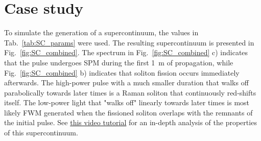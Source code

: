 \begin{table}[]
\end{table}
\section{Case study}
To simulate the generation of a supercontinuum, the values in Tab.~\ref{tab:SC_params} were used. The resulting supercontinuum is presented in Fig.~\ref{fig:SC_combined}. The spectrum in Fig.~\ref{fig:SC_combined} c) indicates that the pulse undergoes SPM during the first 1~m of propagation, while Fig.~\ref{fig:SC_combined} b) indicates that soliton fission occurs immediately afterwards. The high-power pulse with a much smaller duration that walks off parabolically towards later times is a Raman soliton that continuously red-shifts itself. The low-power light that "walks off" linearly towards later times is most likely FWM generated when the fissioned soliton overlaps with the remnants of the initial pulse. See \href{https://youtu.be/-GDsMDpC3oA}{this video tutorial} for an in-depth analysis of the properties of this supercontinuum.

